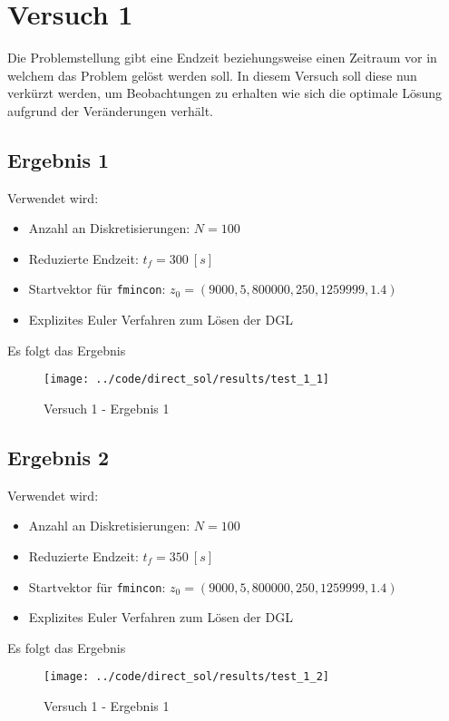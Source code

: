 \newpage
\section{Versuch 1}\label{kap:Versuch1}
Die Problemstellung gibt eine Endzeit beziehungsweise einen Zeitraum vor in welchem das Problem gelöst werden soll. In diesem Versuch soll diese nun verkürzt werden, um Beobachtungen zu erhalten wie sich die optimale Lösung aufgrund der Veränderungen verhält. %

\subsection{Ergebnis 1}\label{kap:Versuch11}
Verwendet wird:
\begin{itemize}
\item Anzahl an Diskretisierungen: $N = 100$ 
\item Reduzierte Endzeit: $t_f = 300 \ [s]$
\item Startvektor für \texttt{fmincon}: $z_0 = (9000,5,800000,250,1259999,1.4)$
\item Explizites Euler Verfahren zum Lösen der DGL
\end{itemize}
Es folgt das Ergebnis
\begin{figure}[H]
\begin{center}
\texttt{[image: ../code/direct\_sol/results/test\_1\_1]}
\caption{Versuch 1 - Ergebnis 1}\label{img:test_1_1}
\end{center}
\end{figure}

\newpage
\subsection{Ergebnis 2}\label{kap:Versuch12}
Verwendet wird:
\begin{itemize}
\item Anzahl an Diskretisierungen: $N = 100$ 
\item Reduzierte Endzeit: $t_f = 350 \ [s]$
\item Startvektor für \texttt{fmincon}: $z_0 = (9000,5,800000,250,1259999,1.4)$
\item Explizites Euler Verfahren zum Lösen der DGL
\end{itemize}
Es folgt das Ergebnis
\begin{figure}[H]
\begin{center}
\texttt{[image: ../code/direct\_sol/results/test\_1\_2]}
\caption{Versuch 1 - Ergebnis 1}\label{img:test_1_2}
\end{center}
\end{figure}

